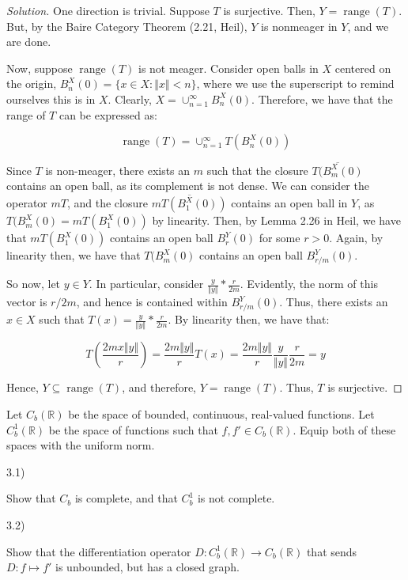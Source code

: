 \documentclass[10pt]{article}
\newenvironment{problem}[2][]{\begin{trivlist}
\item[\hskip \labelsep {\bfseries #1}\hskip \labelsep {\bfseries #2.}]}{\end{trivlist}}
\begin{document}
\begin{proof}[Solution]

One direction is trivial. Suppose $T$ is surjective. Then, $Y = \operatorname{range}(T)$. But, by the Baire Category Theorem (2.21, Heil), $Y$ is nonmeager in $Y$, and we are done.

Now, suppose $\operatorname{range}(T)$ is not meager. Consider open balls in $X$ centered on the origin, $B_n^X(0) = \{ x \in X : \Vert x \Vert < n \}$, where we use the superscript to remind ourselves this is in $X$. Clearly, $X = \cup_{n=1}^\infty B_n^X(0)$. Therefore, we have that the range of $T$ can be expressed as:

$$ \operatorname{range}(T) = \cup_{n=1}^\infty T(B_n^X(0)) $$

Since $T$ is non-meager, there exists an $m$ such that the closure $\overline{T(B_m^X(0)}$ contains an open ball, as its complement is not dense. We can consider the operator $mT$, and the closure $\overline{mT(B_1^X(0))}$ contains an open ball in $Y$, as $T(B_m^X(0) = mT(B_1^X(0))$ by linearity. Then, by Lemma 2.26 in Heil, we have that $mT(B_1^X(0))$ contains an open ball $B_r^Y(0)$ for some $r > 0$. Again, by linearity then, we have that $T(B_m^X(0)$ contains an open ball $B_{r/m}^Y(0)$.

So now, let $y \in Y$. In particular, consider $\frac{y}{\Vert y \Vert} * \frac{r}{2m}$. Evidently, the norm of this vector is $r/2m$, and hence is contained within $B_{r/m}^Y(0)$. Thus, there exists an $x \in X$ such that $T(x) = \frac{y}{\Vert y \Vert} * \frac{r}{2m}$. By linearity then, we have that:

$$T\left( \frac{2mx \Vert y \Vert}{r} \right) = \frac{2m\Vert y \Vert}{r} T(x) =  \frac{2m\Vert y \Vert}{r} \frac{y}{\Vert y \Vert}  \frac{r}{2m} = y$$

Hence, $Y \subseteq \operatorname{range}(T)$, and therefore, $Y = \operatorname{range}(T)$. Thus, $T$ is surjective. 

\end{proof}

\begin{problem}{Question 3}

Let $C_b(\mathbb{R})$ be the space of bounded, continuous, real-valued functions. Let $C^1_b(\mathbb{R})$ be the space of functions such that $f, f' \in C_b(\mathbb{R})$. Equip both of these spaces with the uniform norm.

3.1)

Show that $C_b$ is complete, and that $C^1_b$ is not complete.

3.2)

Show that the differentiation operator $D: C^1_b(\mathbb{R}) \to C_b(\mathbb{R})$ that sends $D: f \mapsto f'$ is unbounded, but has a closed graph.

\end{problem}
\end{document}
